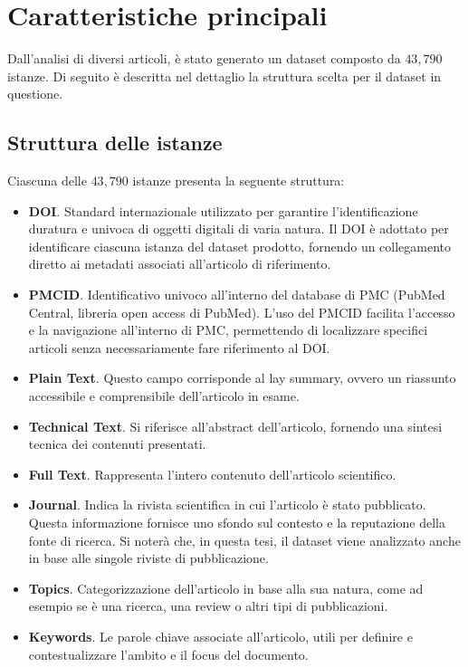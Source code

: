 \documentclass[12pt,a4paper,twoside,openright]{book}
\begin{document}
\section{Caratteristiche principali} 
Dall'analisi di diversi articoli, è stato generato un dataset composto da $43,790$ istanze.  Di seguito è descritta nel dettaglio la struttura scelta per il dataset in questione.

\subsection{Struttura delle istanze}
Ciascuna delle $43,790$ istanze presenta la seguente struttura:
\begin{itemize}
    \item \textbf{DOI}. Standard internazionale utilizzato per garantire l'identificazione duratura e univoca di oggetti digitali di varia natura. Il DOI è adottato per identificare ciascuna istanza del dataset prodotto, fornendo un collegamento diretto ai metadati associati all'articolo di riferimento.
    \item \textbf{PMCID}. Identificativo univoco all'interno del database di PMC (PubMed Central, libreria open access di PubMed). L'uso del PMCID facilita l'accesso e la navigazione all'interno di PMC, permettendo di localizzare specifici articoli senza necessariamente fare riferimento al DOI.
    \item \textbf{Plain Text}. Questo campo corrisponde al lay summary, ovvero un riassunto accessibile e comprensibile dell'articolo in esame.
    \item \textbf{Technical Text}. Si riferisce all'abstract dell'articolo, fornendo una sintesi tecnica dei contenuti presentati.
    \item \textbf{Full Text}. Rappresenta l'intero contenuto dell'articolo scientifico.
    \item \textbf{Journal}. Indica la rivista scientifica in cui l'articolo è stato pubblicato. Questa informazione fornisce uno sfondo sul contesto e la reputazione della fonte di ricerca. Si noterà che, in questa tesi, il dataset viene analizzato anche in base alle singole riviste di pubblicazione.
    \item \textbf{Topics}. Categorizzazione dell'articolo in base alla sua natura, come ad esempio se è una ricerca, una review o altri tipi di pubblicazioni.
    \item \textbf{Keywords}. Le parole chiave associate all'articolo, utili per definire e contestualizzare l'ambito e il focus del documento.
\end{itemize}
\end{document}
